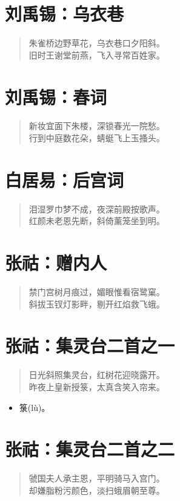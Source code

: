 \documentclass[12pt,oneside]{book}
\newenvironment{shici}{
\begin{verse}
\centering\large\hspace{12pt}}
{\end{verse}}
\begin{document}
\chapter{刘禹锡：乌衣巷}
\begin{shici}
朱雀桥边野草花，乌衣巷口夕阳斜。\\
旧时王谢堂前燕，飞入寻常百姓家。
\end{shici}

\chapter{刘禹锡：春词}
\begin{shici}
新妆宜面下朱楼，深锁春光一院愁。\\
行到中庭数花朵，蜻蜓飞上玉搔头。
\end{shici}

\chapter{白居易：后宫词}
\begin{shici}
泪湿罗巾梦不成，夜深前殿按歌声。\\
红颜未老恩先断，斜倚薰笼坐到明。
\end{shici}

\chapter{张祜：赠内人}
\begin{shici}
禁门宫树月痕过，媚眼惟看宿鹭窠。\\
斜拔玉钗灯影畔，剔开红焰救飞蛾。
\end{shici}

\chapter{张祜：集灵台二首之一}
\begin{shici}
日光斜照集灵台，红树花迎晓露开。\\
昨夜上皇新授箓，太真含笑入帘来。
\end{shici}

\begin{itemize}
\item 箓(lù)。
\end{itemize}

\chapter{张祜：集灵台二首之二}
\begin{shici}
虢国夫人承主恩，平明骑马入宫门。\\
却嫌脂粉污颜色，淡扫蛾眉朝至尊。
\end{shici}
\end{document}

